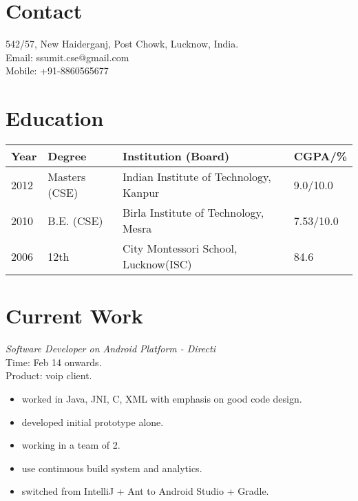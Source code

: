 \documentclass[margin,line]{resume}
\begin{document}
\begin{resume}

    \section{\mysidestyle Contact}
    	542/57, New Haiderganj, Post Chowk, Lucknow, India.\\
    	Email: ssumit.cse@gmail.com\\
    	Mobile: +91-8860565677\\
    \section{\mysidestyle Education}

\begin{center}
    \begin{tabular}{ | l | l | l | l |}
    \hline
    Year & Degree & Institution (Board) & CGPA/\% \\ \hline
    2012 & Masters (CSE) & Indian Institute of Technology, Kanpur & 9.0/10.0 \\ \hline
    2010 & B.E. (CSE) & Birla Institute of Technology, Mesra & 7.53/10.0 \\ \hline
    2006 & 12th & City Montessori School, Lucknow(ISC) & 84.6 \\   \hline
    \end{tabular}
\end{center}




    \section{\mysidestyle Current Work}

\textit{Software Developer on Android Platform - Directi} \\
Time: Feb 14 onwards.\\
Product: voip client.\\
\begin{itemize}
	\item worked in Java, JNI, C, XML with emphasis on good code design.
        \item developed initial prototype alone.
        \item working in a team of 2.
	\item use continuous build system and analytics.
	\item switched from IntelliJ + Ant to Android Studio + Gradle.
 \end{itemize}


\end{resume}
\end{document}
